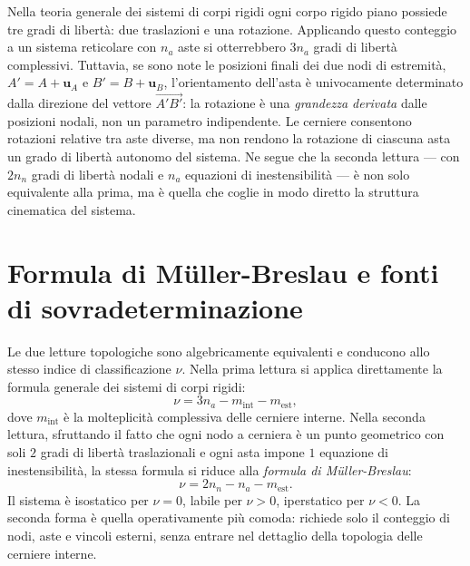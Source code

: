 \begin{oss}\label{oss:rotazione_asta}
	Nella teoria generale dei sistemi di corpi rigidi
	ogni corpo rigido piano possiede tre gradi di
	libertà: due traslazioni e una rotazione.
	Applicando questo conteggio a un sistema
	reticolare con $n_a$ aste si otterrebbero
	$3n_a$ gradi di libertà complessivi.
	Tuttavia, se sono note le posizioni finali dei
	due nodi di estremità, $A' = A + \mathbf{u}_A$ e
	$B' = B + \mathbf{u}_B$, l'orientamento dell'asta
	è univocamente determinato dalla direzione del
	vettore $\overrightarrow{A'B'}$:
	la rotazione è una \emph{grandezza derivata}
	dalle posizioni nodali, non un parametro
	indipendente. Le cerniere consentono rotazioni
	relative tra aste diverse, ma non rendono la
	rotazione di ciascuna asta un grado di libertà
	autonomo del sistema. Ne segue che la seconda
	lettura --- con $2n_n$ gradi di libertà nodali
	e $n_a$ equazioni di inestensibilità --- è non
	solo equivalente alla prima, ma è quella che
	coglie in modo diretto la struttura cinematica
	del sistema.
\end{oss}


\section{Formula di M\"{u}ller-Breslau e fonti di sovradeterminazione}
\label{sec:muller_breslau_classificazione}

Le due letture topologiche sono algebricamente
equivalenti e conducono allo stesso indice di
classificazione $\nu$. Nella prima lettura si
applica direttamente la formula generale dei
sistemi di corpi rigidi:
\[
\nu = 3n_a - m_{\text{int}} - m_{\text{est}},
\]
dove $m_{\text{int}}$ è la molteplicità complessiva
delle cerniere interne. Nella seconda lettura,
sfruttando il fatto che ogni nodo a cerniera è un
punto geometrico con soli $2$ gradi di libertà
traslazionali e ogni asta impone $1$ equazione di
inestensibilità, la stessa formula si riduce alla
\emph{formula di M\"{u}ller-Breslau}:
\begin{equation}\label{eq:muller_breslau}
	\nu = 2n_n - n_a - m_{\text{est}}.
\end{equation}
Il sistema è isostatico per $\nu = 0$, labile per
$\nu > 0$, iperstatico per $\nu < 0$.
La seconda forma è quella operativamente più
comoda: richiede solo il conteggio di nodi, aste
e vincoli esterni, senza entrare nel dettaglio
della topologia delle cerniere interne.

